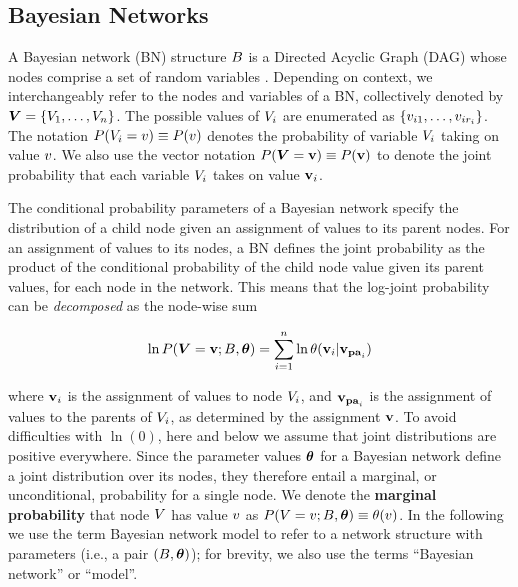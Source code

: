 {{\subsection{Bayesian Networks}

A Bayesian network (BN) structure $B$ is a Directed Acyclic Graph (DAG)  whose nodes comprise a set of random variables \cite{Pearl1988}. Depending on context, we interchangeably refer to the nodes  and variables of a BN, collectively denoted by $\boldsymbol{V} = \{V_{1},\ldots,V_{n}\}$. 
The possible values of $V_{i}$ are enumerated as $\{v_{i1},\ldots,v_{ir_{i}}\}$. The notation $P(V_{i} = v)\equiv P(v)$ denotes the probability of variable $V_{i}$ taking on value $v$. We also use the vector notation $P(\boldsymbol{V} = \mathbf{v}) \equiv P(\mathbf{v})$ to denote the joint probability that each variable $V_{i}$ takes on value $\mathbf{v}_{i}$. 


The conditional probability parameters of a Bayesian network specify the distribution of a child node given an assignment of values to its parent nodes. For an assignment of values to its nodes, a BN defines the joint probability as the product of the conditional probability of the child node value given its parent values, for each node in the network. This means that the log-joint probability can be {\em decomposed} as the node-wise sum

\begin{equation} \label{eq:bn}
\ln P(\boldsymbol{V} = \mathbf{v};B,\boldsymbol{\theta}) = \sum_{i=1}^{n} \ln \theta(\mathbf{v}_{i}|\mathbf{v}_{\mathbf{pa}_{i}})
\end{equation}

\noindent where $\mathbf{v}_{i}$ is the assignment of values to node $V_{i}$, and $\mathbf{v}_{\mathbf{pa}_{i}}$  is the assignment of values to the parents of $V_{i}$, as determined by the assignment $\mathbf{v}$. 
To avoid difficulties with $\ln(0)$, here and below we assume that joint distributions are positive everywhere. Since the parameter values $\boldsymbol{\theta}$ for a Bayesian network define a joint distribution over its nodes, they therefore entail a marginal, or unconditional, probability for a single node. We denote the \textbf{marginal probability} that node $V$ has value $v$ as $P(V = v;B,\boldsymbol{\theta}) \equiv \theta(v)$. In the following we use the term Bayesian network model to refer to a network structure with parameters (i.e., a pair $(B,\boldsymbol{\theta})$); for brevity, we also use the terms ``Bayesian network'' or ``model''. 

}}

